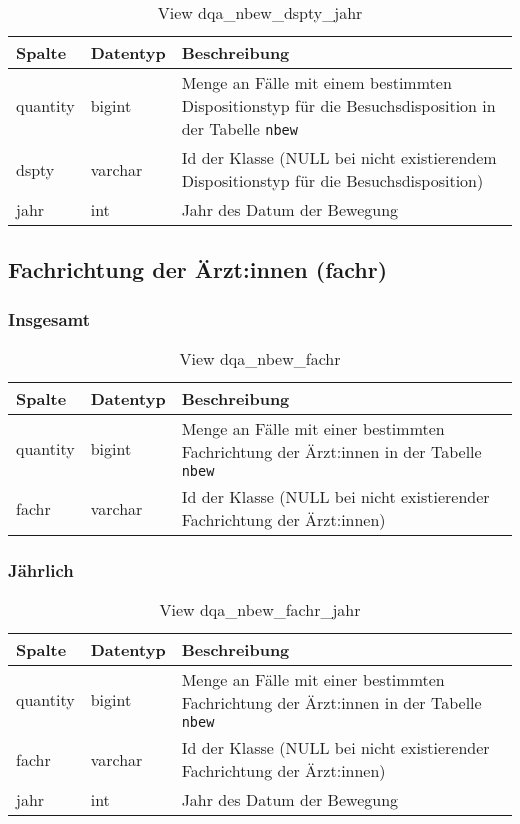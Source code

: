 \begin{table}[ht]
	\centering   
	\caption{View dqa\_nbew\_dspty\_jahr}
	\label{tab:bewDsptyJ}
	\begin{tabular}{||l|l|p{10cm}||}   		
		\hline
		Spalte & Datentyp & Beschreibung \\ [0.5ex]
		\hline\hline
		quantity & bigint & Menge an Fälle mit einem bestimmten Dispositionstyp für die Besuchsdisposition in der Tabelle \texttt{nbew}\\
		\hline
		dspty & varchar & Id der Klasse (NULL bei nicht existierendem Dispositionstyp für die Besuchsdisposition)\\
		\hline
		jahr & int &  Jahr des Datum der Bewegung \\
		\hline		
	\end{tabular}
\end{table}

\subsection{Fachrichtung der Ärzt:innen (fachr)} \label{subsec:bewFachr}

\subsubsection{Insgesamt} \label{subsubsec:bewFachrI}

\begin{table}[ht]
	\centering   
	\caption{View dqa\_nbew\_fachr}
	\label{tab:bewFachrI}
	\begin{tabular}{||l|l|p{10cm}||}   		
		\hline
		Spalte & Datentyp & Beschreibung \\ [0.5ex]
		\hline\hline
		quantity & bigint & Menge an Fälle mit einer bestimmten Fachrichtung der Ärzt:innen in der Tabelle \texttt{nbew} \\
		\hline
		fachr & varchar & Id der Klasse (NULL bei nicht existierender Fachrichtung der Ärzt:innen)\\
		\hline
		
	\end{tabular}
\end{table}

\subsubsection{Jährlich} \label{subsubsec:bewFachrJ}

\begin{table}[ht]
	\centering   
	\caption{View dqa\_nbew\_fachr\_jahr}
	\label{tab:bewFachrJ}
	\begin{tabular}{||l|l|p{10cm}||}   		
		\hline
		Spalte & Datentyp & Beschreibung \\ [0.5ex]
		\hline\hline
		quantity & bigint & Menge an Fälle mit einer bestimmten Fachrichtung der Ärzt:innen in der Tabelle \texttt{nbew}\\
		\hline
		fachr & varchar & Id der Klasse (NULL bei nicht existierender Fachrichtung der Ärzt:innen)\\
		\hline
		jahr & int &  Jahr des Datum der Bewegung \\
		\hline		
	\end{tabular}
\end{table}

